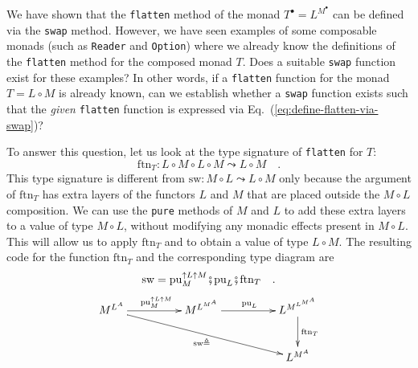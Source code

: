We have shown that the \texttt{}\lstinline!flatten!
method of the monad $T^{\bullet}=L^{M^{\bullet}}$ can be defined
via the \texttt{}\lstinline!swap!
method. However, we have seen examples of some composable monads (such
as \texttt{}\lstinline!Reader!
and \lstinline!Option!)
where we already know the definitions of the \texttt{}\lstinline!flatten!
method for the composed monad $T$. Does a suitable \texttt{}\lstinline!swap!
function exist for these examples? In other words, if a \texttt{}\lstinline!flatten!
function for the monad $T=L\circ M$ is already known, can we establish
whether a \texttt{}\lstinline!swap!
function exists such that the\emph{ given} \texttt{}\lstinline!flatten!
function is expressed via Eq.~(\ref{eq:define-flatten-via-swap})? 

To answer this question, let us look at the type signature of \texttt{}\lstinline!flatten!
for $T$:
\[
\text{ftn}_{T}:L\circ M\circ L\circ M\leadsto L\circ M\quad.
\]
This type signature is different from $\text{sw}:M\circ L\leadsto L\circ M$
only because the argument of $\text{ftn}_{T}$ has extra layers of
the functors $L$ and $M$ that are placed outside the $M\circ L$
composition. We can use the \lstinline!pure!
methods of $M$ and $L$ to add these extra layers to a value of type
$M\circ L$, without modifying any monadic effects present in $M\circ L$.
This will allow us to apply $\text{ftn}_{T}$ and to obtain a value
of type $L\circ M$. The resulting code for the function $\text{ftn}_{T}$
and the corresponding type diagram are
\begin{equation}
\text{sw}=\text{pu}_{M}^{\uparrow L\uparrow M}\bef\text{pu}_{L}\bef\text{ftn}_{T}\quad.\label{eq:define-swap-via-flatten}
\end{equation}
\[
\xymatrix{\xyScaleY{2pc}\xyScaleX{4pc}M^{L^{A}}\ar[r]\sp(0.5){\text{pu}_{M}^{\uparrow L\uparrow M}}\ar[rrd]\sb(0.5){\text{sw}\triangleq} & M^{L^{M^{A}}}\ar[r]\sp(0.5){\text{pu}_{L}} & L^{M^{L^{M^{A}}}}\ar[d]\sp(0.45){\text{ftn}_{T}}\\
 &  & L^{M^{A}}
}
\]

